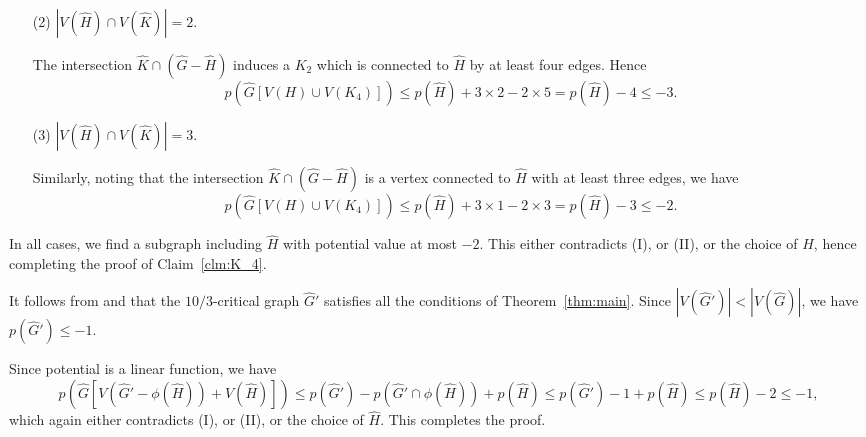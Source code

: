 \documentclass[10pt,a4paper]{amsart}
\makeatletter
\renewenvironment{proof}[1][\proofname]{\par
	\pushQED{\qed}%
	\normalfont \topsep6\p@\@plus6\p@\relax
	\trivlist
	\item[\hskip\labelsep
	\bfseries
	#1\@addpunct{.}]\ignorespaces
}{%
	\popQED\endtrivlist\@endpefalse
}
\makeatother
\begin{document}
\begin{proof}
\begin{itemize}
		
		\item[(2)] $|V(\widehat{H}) \cap V(\widehat{K})|=2$.
		
		The intersection $\widehat{K}\cap (\widehat{G}-\widehat{H})$ induces a $K_{2}$ which is connected to $\widehat{H}$ by at least four edges. Hence $$p(\widehat{G}[V(H)\cup V(K_4)])\leq p(\widehat{H})+3\times 2-2\times 5=p(\widehat{H})-4\leq -3.$$ 
		
		
		\item[(3)] $|V(\widehat{H}) \cap V(\widehat{K})|=3$.
		
		Similarly, noting that the  intersection $\widehat{K}\cap (\widehat{G}-\widehat{H})$ is a vertex connected to $\widehat{H}$ with at least three edges, we have
		$$p(\widehat{G}[V(H)\cup V(K_4)])\leq p(\widehat{H})+3\times 1-2\times 3=p(\widehat{H})-3\leq -2.$$ 
		
	\end{itemize}
	
	In all cases, we find a subgraph including $\widehat{H}$ with potential value at most $-2$. This either contradicts (I), or  (II), or the choice of $\widehat{H}$, hence completing the proof of Claim~\ref{clm:K_4}.
	\bigskip
	
	It follows from  and  that the $10/3$-critical graph $\widehat{G}'$ satisfies all the conditions of Theorem~\ref{thm:main}. Since $|V(\widehat{G}')|<|V(\widehat{G})|$, we have $p(\widehat{G}')\leq -1$.
	
Since potential is a linear function, we have 	$$p(\widehat{G}[V(\widehat{G}'-\phi(\widehat{H}))+V(\widehat{H})])\leq p(\widehat{G}')-p(\widehat{G}'\cap \phi(\widehat{H}))+p(\widehat{H})\leq p(\widehat{G}')-1+p(\widehat{H})\leq p(\widehat{H})-2\leq -1, $$
	which again either contradicts  (I), or  (II), or the choice of $\widehat{H}$. This completes the proof.
\end{proof}
\end{document}
